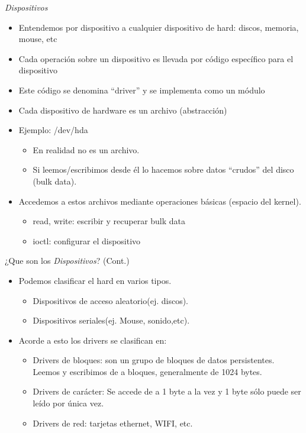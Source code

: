 \begin{frame}{\textit{Dispositivos}}
  \begin{itemize}
	\item Entendemos por dispositivo a cualquier dispositivo de hard: discos, memoria, mouse, etc
	\item Cada operación sobre un dispositivo es llevada por código específico para el dispositivo
	\item Este código se denomina “driver” y se implementa como un módulo
        \item Cada dispositivo de hardware es un archivo (abstracción)
 	\item Ejemplo: /dev/hda
	\begin{itemize}
		\item En realidad no es un archivo.
		\item Si leemos/escribimos desde él lo hacemos sobre datos “crudos” del disco (bulk data).
	\end{itemize}
         \item Accedemos a estos archivos mediante operaciones básicas (espacio del kernel).
	\begin{itemize}
		\item read, write: escribir y recuperar bulk data
		\item ioctl: configurar el dispositivo 

	\end{itemize}
  \end{itemize}
\end{frame}


\begin{frame}{¿Que son los \textit{Dispositivos}? (Cont.)}
  \begin{itemize}
	\item Podemos clasificar el hard en varios tipos.
	\begin{itemize}
		\item Dispositivos de acceso aleatorio(ej. discos). 
		\item Dispositivos seriales(ej. Mouse, sonido,etc).
	\end{itemize}	
	\item Acorde a esto los drivers se clasifican en:
     	\begin{itemize}
		\item Drivers de bloques: son un grupo de bloques de datos persistentes. Leemos y escribimos de a bloques, generalmente de 			1024 bytes. 
		\item Drivers de carácter: Se accede de a 1 byte a la vez y 1 byte sólo puede ser leído por única vez.
		\item Drivers de red: tarjetas ethernet, WIFI, etc.
	\end{itemize}	
  \end{itemize}
\end{frame}

